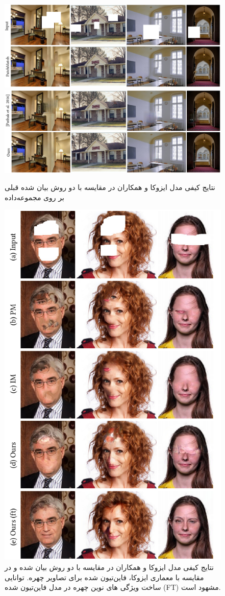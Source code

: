 \begin{figure}
	\centering
	\includegraphics[width=1\linewidth]{IISUKqual1}
	\includegraphics[width=1\linewidth]{IISUKqual2}
	\caption{نتایج کیفی مدل ایزوکا و همکاران در مقایسه با دو روش بیان شده  قبلی بر روی مجموعه‌داده }
	\label{fig:iisukqual2}
\end{figure}


\begin{figure}
	\centering
	\includegraphics[width=0.5\linewidth]{IISUKqual3}
	\caption{نتایج کیفی مدل ایزوکا و همکاران در مقایسه با دو روش بیان شده  و در مقایسه با معماری ایزوکا، فاین‌تیون شده برای تصاویر چهره. توانایی ساخت ویژگی های نوین چهره در مدل فاین‌تیون شده (FT) مشهود است.}
	\label{fig:iisukqual3}
\end{figure}



